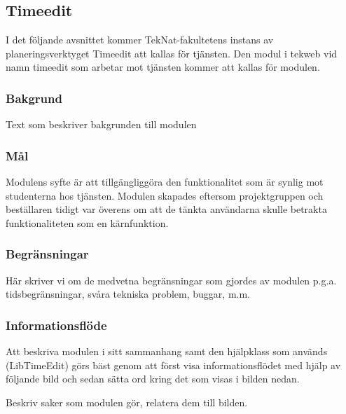 \subsection{Timeedit}
I det följande avsnittet kommer TekNat-fakultetens instans av
planeringsverktyget Timeedit att kallas för tjänsten. Den modul i tekweb
vid namn timeedit som arbetar mot tjänsten kommer att kallas för
modulen.

\subsubsection{Bakgrund}
Text som beskriver bakgrunden till modulen

\subsubsection{Mål}
Modulens syfte är att tillgängliggöra den funktionalitet som är synlig
mot studenterna hos tjänsten. Modulen skapades eftersom projektgruppen
och beställaren tidigt var överens om att de tänkta användarna skulle
betrakta funktionaliteten som en kärnfunktion.

\subsubsection{Begränsningar}
Här skriver vi om de medvetna begränsningar som gjordes av modulen
p.g.a. tidsbegränsningar, svåra tekniska problem, buggar, m.m.

\subsubsection{Informationsflöde}
Att beskriva modulen i sitt sammanhang samt den hjälpklass som används
(LibTimeEdit) görs bäst genom att först visa informationsflödet med
hjälp av följande bild och sedan sätta ord kring det som visas i bilden
nedan.

Beskriv saker som modulen gör, relatera dem till bilden.

